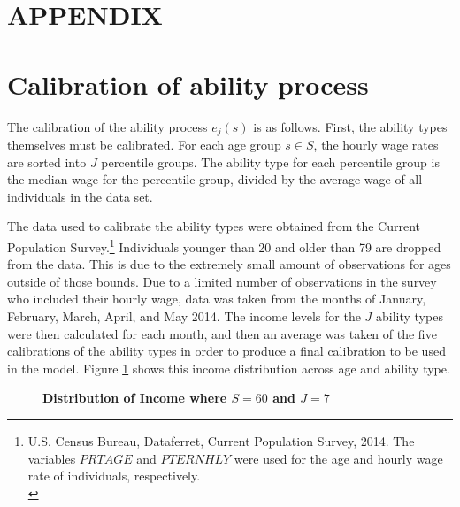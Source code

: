\documentclass[letterpaper,12pt]{article}
\theoremstyle{definition}
\begin{document}
\section*{APPENDIX}                              %

\section{Calibration of ability process}\label{AppAbilCalib}

  The calibration of the ability process $e_j(s)$ is as follows.  First, the ability types themselves must be calibrated. For each age group $s \in S$, the hourly wage rates are sorted into $J$ percentile groups.  The ability type for each percentile group is the median wage for the percentile group, divided by the average wage of all individuals in the data set.

  The data used to calibrate the ability types were obtained from the Current Population Survey.\footnote{U.S. Census Bureau, Dataferret, Current Population Survey, 2014. The variables $PRTAGE$ and $PTERNHLY$ were used for the age and hourly wage rate of individuals, respectively. \\ [-2pt]} Individuals younger than 20 and older than 79 are dropped from the data. This is due to the extremely small amount of observations for ages outside of those bounds. Due to a limited number of observations in the survey who included their hourly wage, data was taken from the months of January, February, March, April, and May 2014.  The income levels for the $J$ ability types were then calculated for each month, and then an average was taken of the five calibrations of the ability types in order to produce a final calibration to be used in the model. Figure \ref{FigIncome} shows this income distribution across age and ability type.

    \begin{figure}[htb]\centering \captionsetup{width=4.0in}
      \caption{\label{FigIncome}\textbf{Distribution of Income where $S=60$ and $J=7$}}
    \end{figure}
\end{document}
